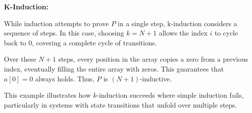 \vspace{\baselineskip}\noindent \textbf{K-Induction:}

\vspace{\baselineskip}\noindent While induction attempts to prove \( P \) in a single step, k-induction considers a sequence of steps. In this case, choosing \( k = N + 1 \) allows the index \( i \) to cycle back to 0, covering a complete cycle of transitions.

Over these \( N+1 \) steps, every position in the array copies a zero from a previous index, eventually filling the entire array with zeros. This guarantees that \( a[0] = 0 \) always holds.
Thus, \( P \) is \( (N+1) \)-inductive.

\vspace{\baselineskip}This example illustrates how \( k \)-induction succeeds where simple induction fails, particularly in systems with state transitions that unfold over multiple steps.







